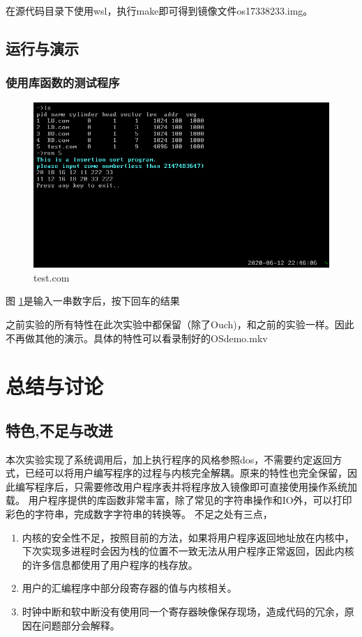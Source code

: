 \documentclass[a4paper, 11pt]{article} %
\begin{document}
在源代码目录下使用wsl，执行make即可得到镜像文件os17338233.img。

\subsection{运行与演示}

\subsubsection{使用库函数的测试程序}
\begin{figure}[H]
  \centering
  \includegraphics[width=0.8\linewidth]{test.png}
  \caption{test.com}
  \label{fig:test.com}
\end{figure}
图 \ref{fig:test.com}是输入一串数字后，按下回车的结果

之前实验的所有特性在此次实验中都保留（除了Ouch)，和之前的实验一样。因此不再做其他的演示。具体的特性可以看录制好的OSdemo.mkv

\section{总结与讨论}



\subsection{特色,不足与改进}

本次实验实现了系统调用后，加上执行程序的风格参照dos，不需要约定返回方式，已经可以将用户编写程序的过程与内核完全解耦。原来的特性也完全保留，因此编写程序后，只需要修改用户程序表并将程序放入镜像即可直接使用操作系统加载。
用户程序提供的库函数非常丰富，除了常见的字符串操作和IO外，可以打印彩色的字符串，完成数字字符串的转换等。
不足之处有三点，
\begin{enumerate}
  \item 内核的安全性不足，按照目前的方法，如果将用户程序返回地址放在内核中，下次实现多进程时会因为栈的位置不一致无法从用户程序正常返回，因此内核的许多信息都使用了用户程序的栈存放。
  \item 用户的汇编程序中部分段寄存器的值与内核相关。
  \item 时钟中断和软中断没有使用同一个寄存器映像保存现场，造成代码的冗余，原因在问题部分会解释。
\end{enumerate}
\end{document}
